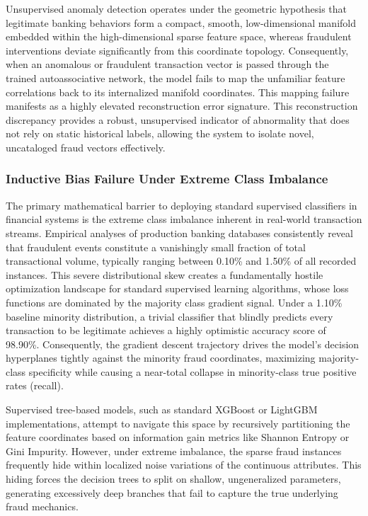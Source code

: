 Unsupervised anomaly detection operates under the geometric hypothesis that legitimate banking behaviors form a compact, smooth, low-dimensional manifold embedded within the high-dimensional sparse feature space, whereas fraudulent interventions deviate significantly from this coordinate topology. Consequently, when an anomalous or fraudulent transaction vector is passed through the trained autoassociative network, the model fails to map the unfamiliar feature correlations back to its internalized manifold coordinates. This mapping failure manifests as a highly elevated reconstruction error signature. This reconstruction discrepancy provides a robust, unsupervised indicator of abnormality that does not rely on static historical labels, allowing the system to isolate novel, uncataloged fraud vectors effectively.

\subsubsection{Inductive Bias Failure Under Extreme Class Imbalance}

The primary mathematical barrier to deploying standard supervised classifiers in financial systems is the extreme class imbalance inherent in real-world transaction streams. Empirical analyses of production banking databases consistently reveal that fraudulent events constitute a vanishingly small fraction of total transactional volume, typically ranging between 0.10\% and 1.50\% of all recorded instances. This severe distributional skew creates a fundamentally hostile optimization landscape for standard supervised learning algorithms, whose loss functions are dominated by the majority class gradient signal. Under a 1.10\% baseline minority distribution, a trivial classifier that blindly predicts every transaction to be legitimate achieves a highly optimistic accuracy score of 98.90\%. Consequently, the gradient descent trajectory drives the model's decision hyperplanes tightly against the minority fraud coordinates, maximizing majority-class specificity while causing a near-total collapse in minority-class true positive rates (recall).

Supervised tree-based models, such as standard XGBoost or LightGBM implementations, attempt to navigate this space by recursively partitioning the feature coordinates based on information gain metrics like Shannon Entropy or Gini Impurity. However, under extreme imbalance, the sparse fraud instances frequently hide within localized noise variations of the continuous attributes. This hiding forces the decision trees to split on shallow, ungeneralized parameters, generating excessively deep branches that fail to capture the true underlying fraud mechanics.

